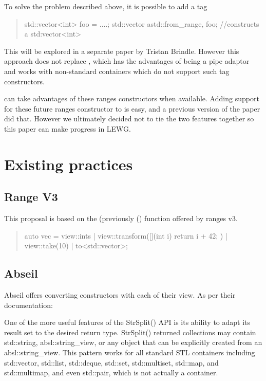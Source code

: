\documentclass{wg21}
\begin{document}
To solve the problem described above, it is possible to add a tag

\begin{quote}
\begin{colorblock}
std::vector<int> foo = ....;
std::vector a{std::from_range, foo}; //constructs a std:vector<int>
\end{colorblock}
\end{quote}

This will be explored in a separate paper by Tristan Brindle.
However this approach does not replace , which has the advantages of being a pipe adaptor and works with
non-standard containers which do not support such tag constructors.

 can take advantages of these ranges constructors when available.
Adding support for these future ranges constructor to  is easy, and a previous version of the paper did that. However we ultimately decided not to tie the two features together so this paper can make progress in LEWG.

\section{Existing practices}


\subsection{Range V3}

This proposal is based on the  (previously () function offered by ranges v3.


\begin{quote}
	\begin{colorblock}
		auto vec = view::ints
		| view::transform([](int i) {
			return i + 42;
		})
		| view::take(10)
		| to<std::vector>;
	\end{colorblock}
\end{quote}



\subsection{Abseil}

Abseil offers converting constructors with each of their view.
As per their documentation:

\begin{quoteblock}
    One of the more useful features of the StrSplit() API is its ability to adapt its result set to the desired return type.
    StrSplit() returned collections may contain std::string, absl::string_view, or any object that can be explicitly created from an absl::string_view.
    This pattern works for all standard STL containers including std::vector,
    std::list, std::deque, std::set, std::multiset, std::map, and std::multimap, and even std::pair, which is not actually a container.
\end{quoteblock}
\end{document}
